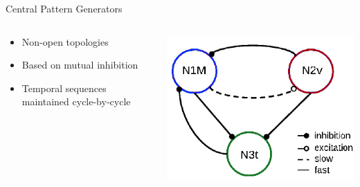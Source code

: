 \documentclass[aspectratio=43]{beamer}
\begin{document}
\begin{frame}{Central Pattern Generators}
		\begin{columns}
			\begin{column}{0.75\textwidth}
				\begin{itemize}
					\item{Non-open topologies}
					\item{Based on mutual inhibition}
					\item{Temporal sequences maintained cycle-by-cycle}
				\end{itemize}
			\end{column}
			\begin{column}{0.3\textwidth}
				\includegraphics[width=\textwidth]{Images/CPG-topology.png} %
			\end{column}
		\end{columns}
		
		\vspace{10pt}
		\centering

\end{frame}
\end{document}
